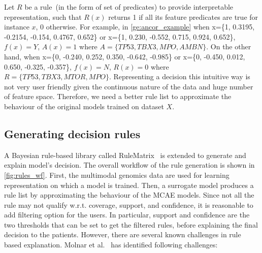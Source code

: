 \hspace*{3.5mm} Let $R$ be a rule~(in the form of set of predicates) to provide interpretable representation, such that $R(x)$ returns 1 if all its feature predicates are true for instance $x$, 0 otherwise. For example, in \cref{ge:ancor_example} when x=\{1, 0.3195, -0.2154, -0.154, 0.4767, 0.652\} or x=\{1, 0.230, -0.552, 0.715, 0.924, 0.652\}, $f(x)=Y$, $A(x)=1$ where $A=\{TP53, TBX3, MPO, AMBN\}$. On the other hand, when x=\{0, -0.240, 0.252, 0.350, -0.642, -0.985\} or x=\{0, -0.450, 0.012, 0.650, -0.325, -0.357\}, $f(x)=N$, $R(x)=0$ where $R=\{TP53, TBX3, MTOR, MPO\}$. Representing a decision this intuitive way is not very user friendly given the continuous nature of the data and huge number of feature space. Therefore, we need a better rule list to approximate the behaviour of the original models trained on dataset $X$. 

\subsection{Generating decision rules}
A Bayesian rule-based library called RuleMatrix~\cite{ming2018rulematrix} is extended to generate and explain model's decision. The overall workflow of the rule generation is shown in \cref{fig:rules_wf}. First, the multimodal genomics data are used for learning representation on which a model is trained. Then, a surrogate model produces a rule list by approximating the behaviour of the MCAE models. Since not all the rule may not qualify w.r.t. coverage, support, and confidence, it is reasonable to add filtering option for the users. In particular, support and confidence are the two thresholds that can be set to get the filtered rules, before explaining the final decision to the patients. However, there are several known challenges in rule based explanation. Molnar et al.~\cite{molnar2019interpretable} has identified following challenges:  

